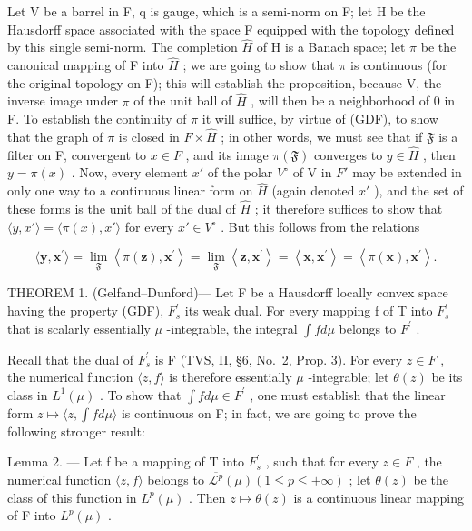 Let V be a barrel in F, q is gauge, which is a semi-norm on F; let H be the Hausdorff space associated with the space F equipped with the topology defined by this single semi-norm. The completion \(\hat{H}\) of H is a Banach space; let \(\pi\) be the canonical mapping of F into \(\hat{H}\) ; we are going to show that \(\pi\) is continuous (for the original topology on F); this will establish the proposition, because V, the inverse image under \(\pi\) of the unit ball of \(\hat{H}\) , will then be a neighborhood of 0 in F. To establish the continuity of \(\pi\) it will suffice, by virtue of (GDF), to show that the graph of \(\pi\) is closed in \(F \times \hat{H}\) ; in other words, we must see that if \(\mathfrak{F}\) is a filter on F, convergent to \(x \in F\) , and its image \(\pi(\mathfrak{F})\) converges to \(y \in \hat{H}\) , then \(y = \pi(x)\) . Now, every element \(x'\) of the polar \(V^{\circ}\) of V in \(F'\) may be extended in only one way to a continuous linear form on \(\hat{H}\) (again denoted \(x'\) ), and the set of these forms is the unit ball of the dual of \(\hat{H}\) ; it therefore suffices to show that \(\langle y, x' \rangle = \langle \pi(x), x' \rangle\) for every \(x' \in V^{\circ}\) . But this follows from the relations

\[
\langle \mathbf {y}, \mathbf {x} ^ {\prime} \rangle = \lim _ {\mathfrak {F}} \left\langle \pi (\mathbf {z}), \mathbf {x} ^ {\prime} \right\rangle = \lim _ {\mathfrak {F}} \left\langle \mathbf {z}, \mathbf {x} ^ {\prime} \right\rangle = \left\langle \mathbf {x}, \mathbf {x} ^ {\prime} \right\rangle = \left\langle \pi (\mathbf {x}), \mathbf {x} ^ {\prime} \right\rangle .
\]

THEOREM 1. (Gelfand--Dunford)--- Let F be a Hausdorff locally convex space having the property (GDF), \(F_{s}^{\prime}\) its weak dual. For every mapping f of T into \(F_{s}^{\prime}\) that is scalarly essentially \(\mu\) -integrable, the integral \(\int f d\mu\) belongs to \(F^{\prime}\) .

Recall that the dual of \(F_{s}^{\prime}\) is F (TVS, II, §6, No.~2, Prop. 3). For every \(z \in F\) , the numerical function \(\langle z, f \rangle\) is therefore essentially \(\mu\) -integrable; let \(\theta(z)\) be its class in \(L^{1}(\mu)\) . To show that \(\int f d\mu \in F^{\prime}\) , one must establish that the linear form \(z \mapsto \langle z, \int f d\mu \rangle\) is continuous on F; in fact, we are going to prove the following stronger result:

Lemma 2. --- Let f be a mapping of T into \(F_{s}^{\prime}\) , such that for every \(z \in F\) , the numerical function \(\langle z, f \rangle\) belongs to \(\overline{\mathcal{L}^{p}}(\mu) (1 \leqslant p \leqslant +\infty)\) ; let \(\theta(z)\) be the class of this function in \(L^{p}(\mu)\) . Then \(z \mapsto \theta(z)\) is a continuous linear mapping of F into \(L^{p}(\mu)\) .

